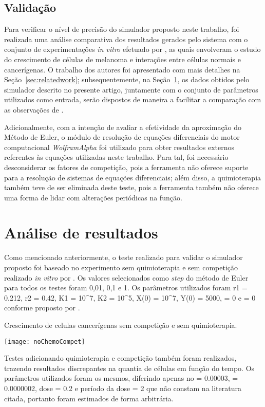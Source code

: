 \documentclass[12pt]{article}
\begin{document}
\subsection{Validação}

Para verificar o nível de precisão do simulador proposto neste trabalho, foi realizada uma análise comparativa dos resultados gerados pelo sistema com o conjunto de experimentações \textit{in vitro} efetuado por \cite{Cornil1991}, as quais envolveram o estudo do crescimento de células de melanoma e interações entre células normais e cancerígenas. O trabalho dos autores foi apresentado com mais detalhes na Seção~\ref{sec:relatedwork}; subsequentemente, na Seção~\ref{sec:results}, os dados obtidos pelo simulador descrito no presente artigo, juntamente com o conjunto de parâmetros utilizados como entrada, serão dispostos de maneira a facilitar a comparação com as observações de \cite{Cornil1991}.

Adicionalmente, com a intenção de avaliar a efetividade da aproximação do Método de Euler, o módulo de resolução de equações diferenciais do motor computacional \emph{WolframAlpha} foi utilizado para obter resultados externos referentes às equações utilizadas neste trabalho. Para tal, foi necessário desconsiderar os fatores de competição, pois a ferramenta não oferece suporte para a resolução de sistemas de equações diferenciais; além disso, a quimioterapia também teve de ser eliminada deste teste, pois a ferramenta também não oferece uma forma de lidar com alterações periódicas na função.

\section{Análise de resultados} \label{sec:results}

Como mencionado anteriormente, o teste realizado para validar o simulador proposto foi baseado no experimento sem quimioterapia e sem competição realizado \textit{in vitro} por \cite{Cornil1991}. Os valores selecionados como \textit{step} do método de Euler para todos os testes foram 0,01, 0,1 e 1.
Os parâmetros utilizados foram r1 = 0.212, r2 = 0.42, K1 = 10^7, K2 = 10^5, X(0) = 10^7, Y(0) = 5000,  = 0 e  = 0 conforme proposto por \cite{Cornil1991}.

Crescimento de celulas cancerígenas sem competição e sem quimioterapia.

\texttt{[image: noChemoCompet]}

Testes adicionando quimioterapia e competição também foram realizados, trazendo resultados discrepantes na quantia de células em função do tempo. Os parâmetros utilizados foram os mesmos, diferindo apenas no  = 0.00003,  = 0.0000002, dose = 0.2 e período da dose = 2 que não constam na literatura citada, portanto foram estimados de forma arbitrária.
\end{document}
